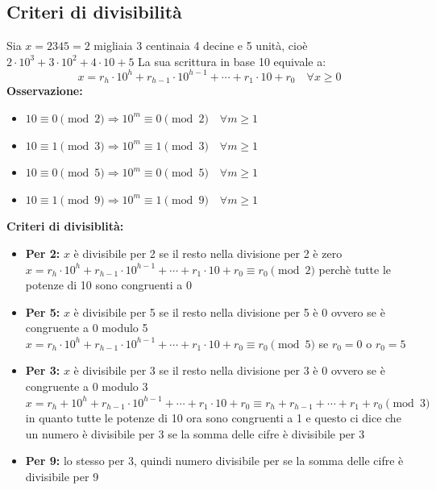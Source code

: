 \documentclass[12pt, letterpaper]{report}
\begin{document}
		\subsection{Criteri di divisibilità}
		Sia $x = 2345 = 2$ migliaia 3 centinaia 4 decine e 5 unità, cioè $2 \cdot 10^3 + 3 \cdot 10^2 + 4 \cdot 10 + 5$
		La sua scrittura in base 10 equivale a:
		\[
		x = r_h \cdot 10^h + r_{h - 1} \cdot 10^{h - 1} + \cdots + r_1 \cdot 10 + r_0 \quad \forall x \geq 0
		\]
		\textbf{Osservazione:}
		\begin{itemize}
			\item $10 \equiv 0 \pmod{2} \Rightarrow 10^m \equiv 0 \pmod{2} \quad \forall m \geq 1$
			\item $10 \equiv 1 \pmod{3} \Rightarrow 10^m \equiv 1 \pmod{3} \quad \forall m \geq 1$
			\item $10 \equiv 0 \pmod{5} \Rightarrow 10^m \equiv 0 \pmod{5} \quad \forall m \geq 1$
			\item $10 \equiv 1 \pmod{9} \Rightarrow 10^m \equiv 1 \pmod{9} \quad \forall m \geq 1$
		\end{itemize}
		\textbf{Criteri di divisiblità:}
		\begin{itemize}
			\item \textbf{Per 2:} $x$ è divisibile per 2 se il resto nella divisione per 2 è zero \\
			$x = r_h \cdot 10^h + r_{h - 1} \cdot 10^{h - 1}+ \cdots + r_1 \cdot 10 + r_0 \equiv r_0 \pmod{2}$ perchè tutte le potenze di 10 sono congruenti a 0
			\item \textbf{Per 5:} $x$ è divisibile per 5 se il resto nella divisione per 5 è 0 ovvero se è congruente a 0 modulo 5 \\
			$x = r_h \cdot 10^h + r_{h - 1} \cdot 10^{h - 1} + \cdots + r_1 \cdot 10 + r_0 \equiv r_0 \pmod{5}$ se $r_0 = 0$ o $r_0 = 5$
			\item \textbf{Per 3:} $x$ è divisibile per 3 se il resto nella divisione per 3 è 0 ovvero se è congruente a 0 modulo 3 \\
			$x = r_h + 10^h + r_{h - 1} \cdot 10^{h - 1} + \cdots + r_1 \cdot 10 + r_0 \equiv r_h + r_{h - 1} + \cdots + r_1 + r_0 \pmod{3}$ in quanto tutte le potenze di 10 ora sono congruenti a 1 e questo ci dice che un numero è divisibile per 3 se la somma delle cifre è divisibile per 3
			\item \textbf{Per 9:} lo stesso per 3, quindi numero divisibile per se la somma delle cifre è divisibile per 9
		\end{itemize}
\end{document}
